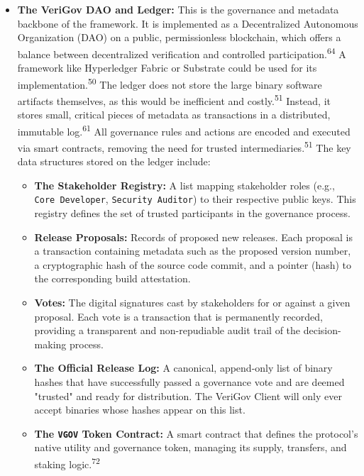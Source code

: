 \documentclass{article}
\begin{document}
\begin{itemize}
\item \textbf{The VeriGov DAO and Ledger:} This is the governance and metadata backbone of the framework. It is implemented as a Decentralized Autonomous Organization (DAO) on a public, permissionless blockchain, which offers a balance between decentralized verification and controlled participation.\textsuperscript{64} A framework like Hyperledger Fabric or Substrate could be used for its implementation.\textsuperscript{50} The ledger does not store the large binary software artifacts themselves, as this would be inefficient and costly.\textsuperscript{51} Instead, it stores small, critical pieces of metadata as transactions in a distributed, immutable log.\textsuperscript{61} All governance rules and actions are encoded and executed via smart contracts, removing the need for trusted intermediaries.\textsuperscript{51} The key data structures stored on the ledger include:
\begin{itemize}
\item \textbf{The Stakeholder Registry:} A list mapping stakeholder roles (e.g., \lstinline{Core Developer}, \lstinline{Security Auditor}) to their respective public keys. This registry defines the set of trusted participants in the governance process.
\item \textbf{Release Proposals:} Records of proposed new releases. Each proposal is a transaction containing metadata such as the proposed version number, a cryptographic hash of the source code commit, and a pointer (hash) to the corresponding build attestation.
\item \textbf{Votes:} The digital signatures cast by stakeholders for or against a given proposal. Each vote is a transaction that is permanently recorded, providing a transparent and non-repudiable audit trail of the decision-making process.
\item \textbf{The Official Release Log:} A canonical, append-only list of binary hashes that have successfully passed a governance vote and are deemed "trusted" and ready for distribution. The VeriGov Client will only ever accept binaries whose hashes appear on this list.
\item \textbf{The \lstinline{VGOV} Token Contract:} A smart contract that defines the protocol's native utility and governance token, managing its supply, transfers, and staking logic.\textsuperscript{72}
\end{itemize}
\end{itemize}
\end{document}
